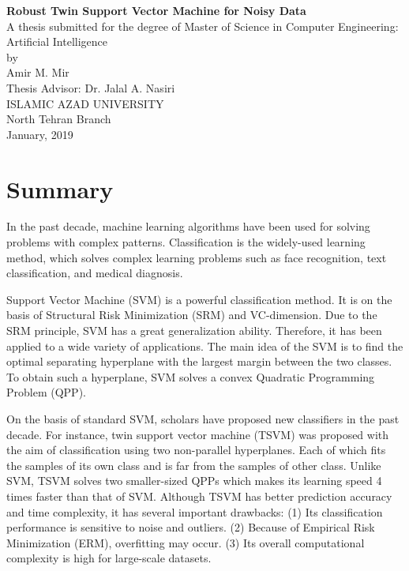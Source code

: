 \documentclass[a4paper, 12pt]{article}
\begin{document}
	
\begin{center}
	{\Large \textbf{Robust Twin Support Vector Machine for Noisy Data}} \\[0.5cm]
	
	A thesis submitted for the degree of Master of Science in Computer Engineering: Artificial Intelligence \\[0.25cm]
	
	by \\[0.25cm]
	{\large Amir M. Mir} \\ [0.5cm]
	
	Thesis Advisor: {Dr. Jalal A. Nasiri} \\[0.25cm]
	
	ISLAMIC AZAD UNIVERSITY \\
	North Tehran Branch \\[0.25cm]
	
	January, 2019
	
\end{center}

\section*{Summary}
In the past decade, machine learning algorithms have been used for solving problems with complex patterns. Classification is the widely-used learning method, which solves complex learning problems such as face recognition, text classification, and medical diagnosis.

Support Vector Machine (SVM) is a powerful classification method. It is on the basis of Structural Risk Minimization (SRM) and VC-dimension. Due to the SRM principle, SVM has a great generalization ability. Therefore, it has been applied to a wide variety of applications. The main idea of the SVM is to find the optimal separating hyperplane with the largest margin between the two classes. To obtain such a hyperplane, SVM solves a convex Quadratic Programming Problem (QPP). 

On the basis of standard SVM, scholars have proposed new classifiers in the past decade. For instance, twin support vector machine (TSVM) was proposed with the aim of classification using two non-parallel hyperplanes. Each of which fits the samples of its own class and is far from the samples of other class. Unlike SVM, TSVM solves two smaller-sized QPPs which makes its learning speed 4 times faster than that of SVM. Although TSVM has better prediction accuracy and time complexity, it has several important drawbacks: (1) Its classification performance is sensitive to noise and outliers. (2) Because of Empirical Risk Minimization (ERM), overfitting may occur. (3) Its overall computational complexity is high for large-scale datasets.
\end{document}
